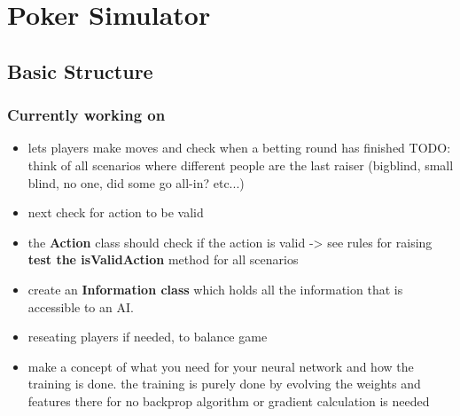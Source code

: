 



\newpage

\chapter{Poker Simulator}
\section{Basic Structure}
\subsection{Currently working on}
\begin{itemize}
\item lets players make moves and check when a betting round has finished
\subitem TODO: think of all scenarios where different people are the last raiser (bigblind, small blind, no one, did some go all-in? etc...)
\item next check for action to be valid
\item the \textbf{Action} class should check if the action is valid -> see rules for raising
\subitem \textbf{test the isValidAction} method for all scenarios 
\item create an \textbf{Information class} which holds all the information that is accessible to an AI.
\item reseating players if needed, to balance game
\item make a concept of what you need for your neural network and how the training is done.
\subitem the training is purely done by evolving the weights and features there for no backprop algorithm or gradient calculation is needed
\end{itemize}
